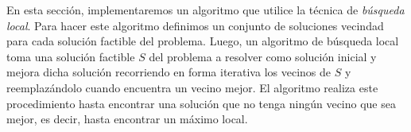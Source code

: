 En esta sección, implementaremos un algoritmo que utilice la técnica de \emph{búsqueda local}. Para hacer este algoritmo definimos un conjunto de soluciones vecindad para cada solución factible del problema. Luego, un algoritmo de búsqueda local toma una solución factible $S$ del problema a resolver como solución inicial y mejora dicha solución recorriendo en forma iterativa los vecinos de $S$ y reemplazándolo cuando encuentra un vecino mejor. El algoritmo realiza este procedimiento hasta encontrar una solución que no tenga ningún vecino que sea mejor, es decir, hasta encontrar un máximo local.